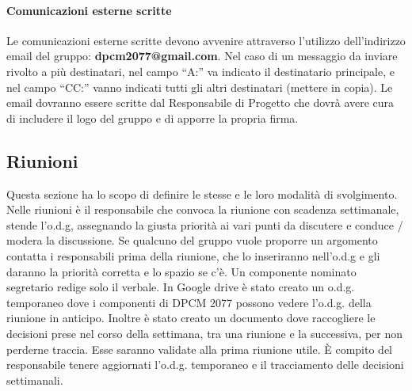 \paragraph{Comunicazioni esterne scritte}
Le comunicazioni esterne scritte devono avvenire attraverso l’utilizzo dell’indirizzo email del gruppo: \textbf{dpcm2077@gmail.com}. 
Nel caso di un messaggio da inviare rivolto a più destinatari, nel campo “A:” va indicato il destinatario principale, e nel campo “CC:” vanno indicati tutti gli altri destinatari (mettere in copia).
Le email dovranno essere scritte dal Responsabile di Progetto che dovrà avere cura di includere il logo del gruppo e di apporre la propria firma.

\subsection{Riunioni}
Questa sezione ha lo scopo di definire le stesse e le loro modalità di svolgimento. Nelle riunioni è il responsabile che convoca la riunione con scadenza settimanale, stende l'o.d.g, assegnando la giusta priorità ai vari punti da discutere e conduce / modera la discussione. Se qualcuno del gruppo vuole proporre un argomento contatta i responsabili prima della riunione, che lo inseriranno nell'o.d.g e gli daranno la priorità corretta e lo spazio se c'è. Un componente nominato segretario redige solo il verbale.
In Google drive è stato creato un o.d.g. temporaneo dove i componenti di DPCM 2077 possono vedere l’o.d.g. della riunione in anticipo. Inoltre è stato creato un documento dove raccogliere le decisioni prese nel corso della settimana, tra una riunione e la successiva, per non perderne traccia. Esse saranno validate alla prima riunione utile. È compito del responsabile tenere aggiornati l'o.d.g. temporaneo e il tracciamento delle decisioni settimanali.
